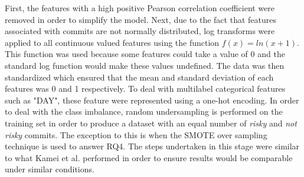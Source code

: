 \documentclass[../main.tex]{subfiles}
\begin{document}
First, the features with a high positive Pearson correlation coefficient were removed in order to simplify the model. Next, due to the fact that features associated with commits are not normally distributed, log transforms were applied to all continuous valued features using the function $f(x) = ln(x+1)$. This function was used because some features could take a value of 0 and the standard log function would make these values undefined. The data was then standardized which ensured that the mean and standard deviation of each features was 0 and 1 respectively. To deal with multilabel categorical features such as "DAY", these feature were represented using a one-hot encoding. In order to deal with the class imbalance, random undersampling is performed on the training set in order to produce a dataset with an equal number of \textit{risky} and \textit{not risky} commits. The exception to this is when the SMOTE over sampling technique is used to answer RQ4. The steps undertaken in this stage were similar to what Kamei et al. performed \cite{kamei2013large} in order to ensure results would be comparable under similar conditions. 
\end{document}

